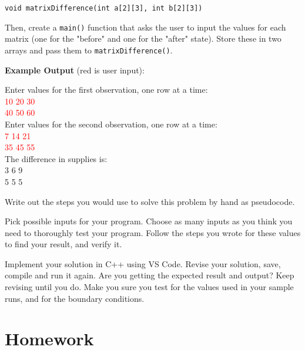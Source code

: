 \texttt{void matrixDifference(int a[2][3], int b[2][3])}

Then, create a \texttt{main()} function that asks the user to input the values for each matrix (one for the "before" and one for the "after" state). Store these in two arrays and pass them to \texttt{matrixDifference()}.

\textbf{Example Output} (red is user input):

\begin{sample}
Enter values for the first observation, one row at a time:\\
\textcolor{red}{10 20 30}\\
\textcolor{red}{40 50 60}\\
Enter values for the second observation, one row at a time:\\
\textcolor{red}{7 14 21}\\
\textcolor{red}{35 45 55}\\
The difference in supplies is:\\
3 6 9\\
5 5 5\\
\end{sample}


\begin{multipart}
    Write out the steps you would use to solve this problem by hand as pseudocode. 
\end{multipart}

\newpage

\begin{multipart}
Pick possible inputs for your program. Choose as many inputs as you think you need to thoroughly test your program. Follow the steps you wrote for these values to find your result, and verify it.
\end{multipart}

\vspace{14cm}

\begin{multipart}
Implement your solution in C++ using VS Code. Revise your solution, save, compile and run it again. Are you getting the expected result and output? Keep revising until you do. Make you sure you test for the values used in your sample runs, and for the boundary conditions.
\end{multipart}

\section{Homework}

